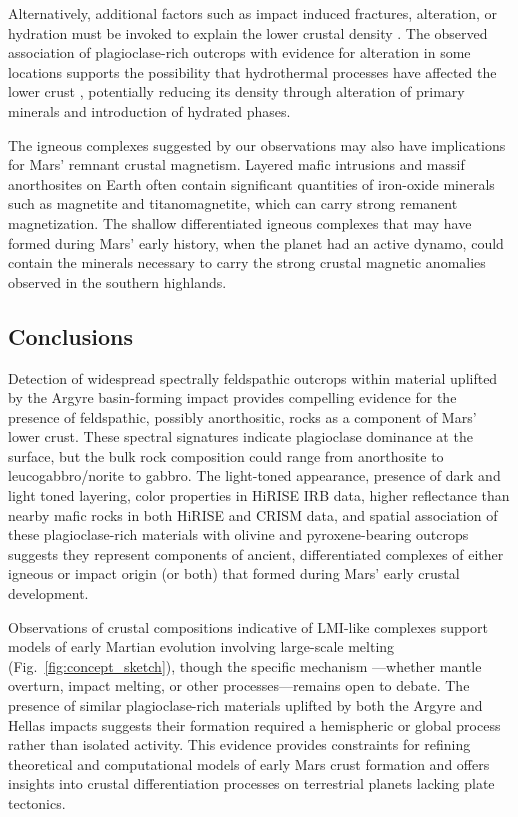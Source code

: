 \documentclass[12pt]{article}
\begin{document}
Alternatively, additional factors such as impact induced fractures, alteration, or hydration must be invoked to explain the lower crustal density \citep{Ehlmann2010, Bandfield2013, Sun2015, Wordsworth2017, Goossens2017,Scheller2020, Wieczorek2022, Carrasco2023}. The observed association of plagioclase-rich outcrops with evidence for alteration in some locations supports the possibility that hydrothermal processes have affected the lower crust \citep[e.g.,][]{Viviano2019, Wu2025}, potentially reducing its density through alteration of primary minerals and introduction of hydrated phases.

The igneous complexes suggested by our observations may also have implications for Mars' remnant crustal magnetism. Layered mafic intrusions and massif anorthosites on Earth often contain significant quantities of iron-oxide minerals such as magnetite and titanomagnetite, which can carry strong remanent magnetization. The shallow differentiated igneous complexes that may have formed during Mars' early history, when the planet had an active dynamo, could contain the minerals necessary to carry the strong crustal magnetic anomalies observed in the southern highlands.

\subsection*{Conclusions}

Detection of widespread spectrally feldspathic outcrops within material uplifted by the Argyre basin-forming impact provides compelling evidence for the presence of feldspathic, possibly anorthositic, rocks as a component of Mars' lower crust. These spectral signatures indicate plagioclase dominance at the surface, but the bulk rock composition could range from anorthosite to leucogabbro/norite to gabbro. The light-toned appearance, presence of dark and light toned layering, color properties in HiRISE IRB data, higher reflectance than nearby mafic rocks in both HiRISE and CRISM data, and spatial association of these plagioclase-rich materials with olivine and pyroxene-bearing outcrops suggests they represent components of ancient, differentiated complexes of either igneous or impact origin (or both) that formed during Mars' early crustal development.

Observations of crustal compositions indicative of LMI-like complexes support models of early Martian evolution involving large-scale melting (Fig.~\ref{fig:concept_sketch}), though the specific mechanism ---whether mantle overturn, impact melting, or other processes---remains open to debate. The presence of similar plagioclase-rich materials uplifted by both the Argyre and Hellas impacts suggests their formation required a hemispheric or global process rather than isolated activity. This evidence provides constraints for refining theoretical and computational models of early Mars crust formation and offers insights into crustal differentiation processes on terrestrial planets lacking plate tectonics.
\end{document}
